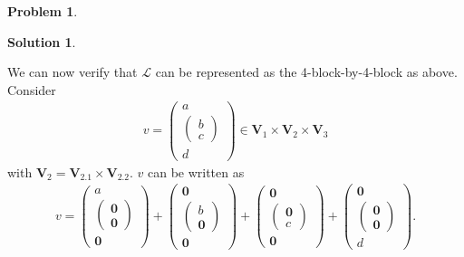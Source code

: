 \documentclass{book}
\theoremstyle{definition}
\newtheorem*{prob*}{Problem}
\newtheorem*{sln*}{Solution}
\newcommand{\V}{\mathbf{V}}
\newcommand{\lag}{\mathcal{L}}
\begin{document}
\begin{prob*}
\begin{sln*}
\begin{enumerate}
		We can now verify that $\lag$ can be represented as the 4-block-by-4-block as above. Consider
		\begin{align*}
		v = \begin{pmatrix}
		a \\ \begin{pmatrix}
		b\\c
		\end{pmatrix}\\
		d
		\end{pmatrix} \in \V_1 \times \V_2 \times \V_3
		\end{align*}
		with $\V_2 = \V_{2.1}\times \V_{2.2}$. $v$ can be written as
		\begin{align*}
		v = \begin{pmatrix}
		a \\ \begin{pmatrix}
		\mathbf{0}\\\mathbf{0}
		\end{pmatrix}\\
		\mathbf{0}
		\end{pmatrix} +
		\begin{pmatrix}
		\mathbf{0} \\ \begin{pmatrix}
		b\\\mathbf{0}
		\end{pmatrix}\\
		\mathbf{0}
		\end{pmatrix} + 
		\begin{pmatrix}
		\mathbf{0} \\ \begin{pmatrix}
		\mathbf{0} \\ c
		\end{pmatrix}\\
		\mathbf{0}
		\end{pmatrix} + 
		\begin{pmatrix}
		\mathbf{0} \\ \begin{pmatrix}
		\mathbf{0} \\ \mathbf{0}
		\end{pmatrix}\\
		d
		\end{pmatrix}.
		\end{align*}
		

\end{enumerate}
\end{sln*}
\end{prob*}
\end{document}
